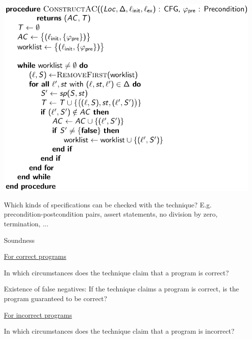 \documentclass[a4paper]{article}
\begin{document}
\begin{minipage}[t]{0.16\linewidth}
\begin{betterlist}
{{				\includegraphics[width=0.7\linewidth]{./figures/bounded_model_checking.png}
			}}
		\item Which kinds of specifications can be checked with the technique? E.g. precondition-postcondition pairs, assert statements, no division by zero, termination, ...

		\item \alert{Soundness}
		\begin{betterlist}
			\item \underline{For correct programs}
			\begin{betterlist}
				\item In which circumstances does the technique claim that a program is correct?

				\item Existence of false negatives: If the technique claims a program is correct, is the program guaranteed to be correct?

			\end{betterlist}
			\item \underline{For incorrect programs}
			\begin{betterlist}
				\item In which circumstances does the technique claim that a program is incorrect?


\end{betterlist}
\end{betterlist}
\end{betterlist}
\end{minipage}
\end{document}
